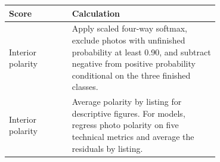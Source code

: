 \begin{tabular}{lp{0.70\linewidth}}
\toprule
Score & Calculation \\
\midrule
Interior polarity & Apply scaled four-way softmax, exclude photos with unfinished probability at least 0.90, and subtract negative from positive probability conditional on the three finished classes. \\
Interior polarity & Average polarity by listing for descriptive figures. For models, regress photo polarity on five technical metrics and average the residuals by listing. \\
\bottomrule
\end{tabular}
